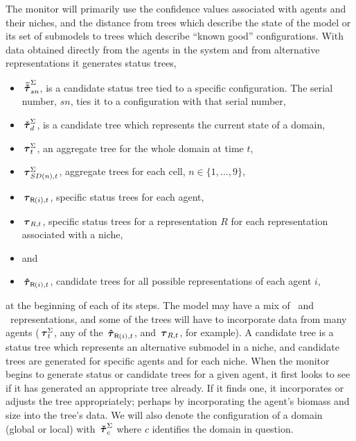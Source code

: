The monitor will primarily use the confidence values associated with
agents and their niches, and the distance from trees which describe
the state of the model or its set of submodels to trees which describe
``known good'' con\-fig\-ur\-a\-tions. With data obtained directly from the
agents in the system and from alternative rep\-re\-sen\-ta\-tions it generates
status trees,
\begin{itemize}
\item{\qquad} $\,\boldsymbol{\bar{\check{\tau}}}^\Sigma_{sn}$, is a candidate status tree tied to a
  specific  con\-fig\-ur\-a\-tion. The serial number, $sn$, ties it to a
  con\-fig\-ur\-a\-tion with that serial number,
\item{\qquad} $\,\boldsymbol{\check{\tau}}^\Sigma_{d}$, is a candidate tree which represents the
  current state of a domain,
\item[\qquad] $\,\boldsymbol{\tau}^\Sigma_{t}$, an aggregate tree for the whole domain at
  time $t$,
\item[\qquad] $\,\boldsymbol{\tau}^\Sigma_{SD(n),t}$, aggregate trees for each cell, $n \in \{1,\ldots, 9\}$,
\item[\qquad] $\,\boldsymbol{\tau}_{\mathsf{R}(i),t}$, specific status trees for each agent,
\item[\qquad] $\,\boldsymbol{\tau}_{R,t}$, specific status trees for a 
  rep\-re\-sen\-ta\-tion $R$ for each rep\-re\-sen\-ta\-tion associated with a niche,
\item[\qquad] \qquad and
\item[\qquad] $\,\boldsymbol{\hat{\tau}}_{\mathsf{R}(i),t}$, candidate trees for all possible
  rep\-re\-sen\-ta\-tions of each agent $i$,
\end{itemize}
at the beginning of each of its steps. The model may have a mix of
\SD\ and \IB\ rep\-re\-sen\-ta\-tions, and some of the trees will have to
incorporate data from many agents ($\,\boldsymbol{\tau}^\Sigma_{t}$, any of the
$\,\boldsymbol{\hat{\tau}}_{\mathsf{R}(i),t}$, and $\,\boldsymbol{\tau}_{R,t}$, for example). A candidate tree is
a status tree which represents an alternative sub\-model in a niche, and
candidate trees are generated for specific agents and for each niche. When the
monitor begins to generate status or candidate trees for a given
agent, it first looks to see if it has generated an appropriate tree
already.  If it finds one, it incorporates or adjusts the tree
appropriately; perhaps by incorporating the agent's biomass  and size
into the tree's data.  We will also denote the con\-fig\-ur\-a\-tion of a
domain (global or local) with $\,\boldsymbol{\check{\tau}}^\Sigma_{c}$ where $c$ identifies the
domain in question.

